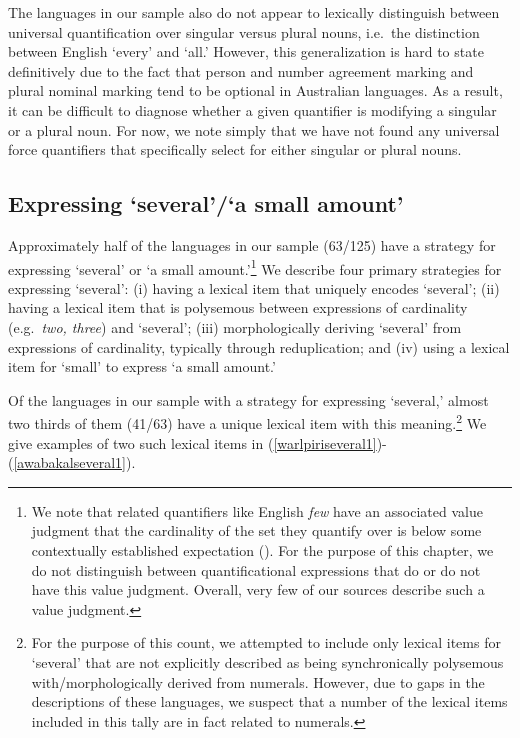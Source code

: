 \documentclass[12pt,egregdoesnotlikesansseriftitles]{scrartcl}
\makeatletter
\newcommand{\ofy}{/125} %
\makeatother
\begin{document}
The languages in our sample also do not appear to lexically distinguish between universal quantification over singular versus plural nouns, i.e.\ the distinction between English `every' and `all.' However, this generalization is hard to state definitively due to the fact that person and number agreement marking and plural nominal marking tend to be optional in Australian languages. As a result, it can be difficult to diagnose whether a given quantifier is modifying a singular or a  plural noun. For now, we note simply that we have not found any universal force quantifiers that specifically select for either singular or plural nouns. %
 


\subsection{Expressing `several'/`a small amount'}

Approximately half of the languages in our sample (63\ofy) have a strategy for expressing `several' or `a small amount.'\footnote{We note that related quantifiers like English \textit{few} have an associated value judgment that the cardinality of the set they quantify over is below some contextually established expectation (\citealt{keenan17qu}). For the purpose of this chapter, we do not distinguish between quantificational expressions that do or do not have this value judgment. Overall, very few of our sources describe such a value judgment.} We describe four primary strategies for expressing `several': (i) having a lexical item that uniquely encodes `several'; (ii) having a lexical item that is polysemous between expressions of cardinality (e.g.\ \textit{two, three}) and `several'; (iii) morphologically deriving `several' from expressions of cardinality, typically through reduplication; and (iv) using a lexical item for `small' to express `a small amount.'

Of the languages in our sample with a strategy for expressing `several,' almost two thirds of them (41/63) have a unique lexical item with this meaning.\footnote{For the purpose of this count, we attempted to include only lexical items for `several' that are not explicitly described as being synchronically polysemous with/morphologically derived from numerals. However, due to gaps in the descriptions of these languages, we suspect that a number of the lexical items included in this tally are in fact related to numerals.} We give examples of two such lexical items in (\ref{warlpiriseveral1})-(\ref{awabakalseveral1}).
\end{document}
